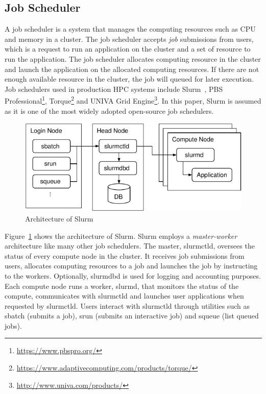 \documentclass[graybox]{svmult}
\begin{document}
\subsection{Job Scheduler}

A job scheduler is a system that manages the computing resources such as CPU
and memory in a cluster. The job scheduler accepts \textit{job} submissions
from users, which is a request to run an application on the cluster and a set
of resource to run the application. The job scheduler allocates computing
resource in the cluster and launch the application on the allocated computing
resources. If there are not enough available resource in the cluster, the job
will queued for later execution. Job schedulers used in production HPC systems
include Slurm~\cite{Yoo2003}, PBS
Professional\footnote{\url{https://www.pbspro.org/}},
Torque\footnote{\url{https://www.adaptivecomputing.com/products/torque/}} and
UNIVA Grid Engine\footnote{\url{http://www.univa.com/products/}}. In this
paper, Slurm is assumed as it is one of the most widely adopted open-source
job schedulers.

\begin{figure}
    \centering
    \includegraphics{slurm}
    \caption{Architecture of Slurm}%
    \label{kt:fig:slurm}
\end{figure}

Figure~\ref{kt:fig:slurm} shows the architecture of Slurm. Slurm employs a
\textit{master-worker} architecture like many other job schedulers. The
master, slurmctld, oversees the status of every compute node in the cluster.
It receives job submissions from users, allocates computing resources to a job
and launches the job by instructing to the workers. Optionally, slurmdbd is
used for logging and accounting purposes. Each compute node runs a worker,
slurmd, that monitors the status of the compute, communicates with slurmctld
and launches user applications when requested by slurmctld. Users interact
with slurmctld through utilities such as sbatch (submits a job), srun (submits
an interactive job) and squeue (list queued jobs).
\end{document}
